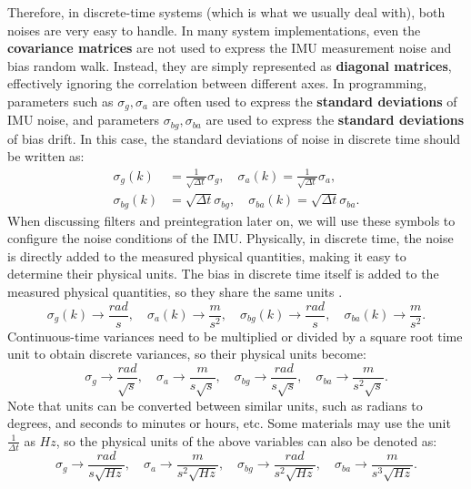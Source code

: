 Therefore, in discrete-time systems (which is what we usually deal with), both noises are very easy to handle. In many system implementations, even the \textbf{covariance matrices} are not used to express the IMU measurement noise and bias random walk. Instead, they are simply represented as \textbf{diagonal matrices}, effectively ignoring the correlation between different axes. In programming, parameters such as $\sigma_g, \sigma_a$ are often used to express the \textbf{standard deviations} of IMU noise, and parameters $\sigma_{bg}, \sigma_{ba}$ are used to express the \textbf{standard deviations} of bias drift. In this case, the standard deviations of noise in discrete time should be written as:
\begin{subequations}\label{eq:noise-std-dev}
	\begin{align}
		\sigma_{g}(k) &= \frac{1}{\sqrt{\Delta t}} \sigma_g , \quad	\sigma_{a}(k) = \frac{1}{\sqrt{\Delta t}} 
		\sigma_a, \\
		\sigma_{bg}(k) &= \sqrt{\Delta t} \sigma_{bg} , \quad 	\sigma_{ba}(k) = \sqrt{\Delta t} \sigma_{ba} .
	\end{align}
\end{subequations}
When discussing filters and preintegration later on, we will use these symbols to configure the noise conditions of the IMU. Physically, in discrete time, the noise is directly added to the measured physical quantities, making it easy to determine their physical units. The bias in discrete time itself is added to the measured physical quantities, so they share the same units \cite{Woodman2007}.
\begin{equation}\label{eq:physical-units}
	\sigma_g (k) \rightarrow \frac{rad}{s}, \quad \sigma_a(k) \rightarrow \frac{m}{s^2}, \quad 
	\sigma_{bg}(k) \rightarrow \frac{rad}{s}, \quad \sigma_{ba}(k) \rightarrow \frac{m}{s^2}.
\end{equation}
Continuous-time variances need to be multiplied or divided by a square root time unit to obtain discrete variances, so their physical units become:
\begin{equation}\label{eq:physical-units-continuous}
	\sigma_g  \rightarrow \frac{rad}{\sqrt{s}}, \quad \sigma_a \rightarrow \frac{m}{s \sqrt{s}}, \quad 
	\sigma_{bg} \rightarrow \frac{rad}{s \sqrt{s}}, \quad \sigma_{ba} \rightarrow \frac{m}{s^2 \sqrt{s}}.
\end{equation}
Note that units can be converted between similar units, such as radians to degrees, and seconds to minutes or hours, etc. Some materials may use the unit $\frac{1}{\Delta t}$ as $Hz$, so the physical units of the above variables can also be denoted as:
\begin{equation}\label{eq:physical-units-hertz}
	\sigma_g  \rightarrow \frac{rad}{s \sqrt{Hz}}, \quad \sigma_a \rightarrow \frac{m}{s^2 \sqrt{Hz}}, 
	\quad \sigma_{bg} \rightarrow \frac{rad}{s^2 \sqrt{Hz}}, \quad \sigma_{ba} \rightarrow \frac{m}{s^3 
		\sqrt{Hz}}.
\end{equation}

